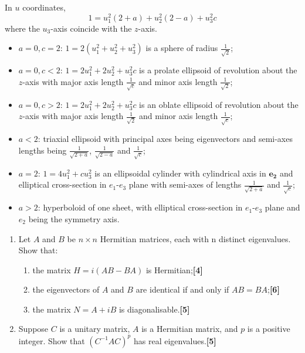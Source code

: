 \documentclass[a4paper]{article}
\begin{document}
\begin{ans}
\begin{enumerate}[label=(\alph*)]
In $u$ coordinates, $$1=u_1^2(2+a)+u_2^2(2-a)+u_3^2c$$
where the $u_3$-axis coincide with the $z$-axis.
\begin{itemize}
    \item $a=0,c=2$: $1=2(u_1^2+u_2^2+u_3^2)$ is a sphere of radius $\frac{1}{\sqrt{2}}$;
    \item $a=0,c<2$: $1=2u_1^2+2u_2^2+u_3^2c$ is a prolate ellipsoid of revolution about the $z$-axis with major axis length $\frac{1}{\sqrt{c}}$ and minor axis length $\frac{1}{\sqrt{2}}$;
    \item $a=0,c>2$: $1=2u_1^2+2u_2^2+u_3^2c$ is an oblate ellipsoid of revolution about the $z$-axis with major axis length $\frac{1}{\sqrt{2}}$ and minor axis length $\frac{1}{\sqrt{c}}$;
    \item $a<2$: triaxial ellipsoid with principal axes being eigenvectors and semi-axes lengths being $\frac{1}{\sqrt{2+a}}$, $\frac{1}{\sqrt{2-a}}$ and $\frac{1}{\sqrt{c}}$;
    \item $a=2$: $1=4u_1^2+cu_3^2$ is an ellipsoidal cylinder with cylindrical axis in $\mathbf{e_2}$ and elliptical cross-section in $e_1$-$e_3$ plane with semi-axes of lengths $\frac{1}{\sqrt{2+a}}$ and $\frac{1}{\sqrt{c}}$;
    \item $a>2$: hyperboloid of one sheet, with elliptical cross-section in $e_1$-$e_3$ plane and $e_2$ being the symmetry axis.
\end{itemize}
\end{enumerate}
\end{ans}
\newpage
\begin{qns}\leavevmode
\begin{enumerate}[label=(\alph*)]
\item Let $A$ and $B$ be $n\times n$ Hermitian matrices, each with n distinct eigenvalues. Show that:
\begin{enumerate}[label=(\roman*)]
\item the matrix $H = i(AB − BA)$ is Hermitian;\hfill\textbf{[4]}
\item the eigenvectors of $A$ and $B$ are identical if and only if $AB = BA$;\hfill\textbf{[6]}
\item the matrix $N = A + iB$ is diagonalisable.\hfill\textbf{[5]}
\end{enumerate}
\item Suppose $C$ is a unitary matrix, $A$ is a Hermitian matrix, and $p$ is a positive integer. Show that $(C^{−1}AC)^p$ has real eigenvalues.\hfill\textbf{[5]}
\end{enumerate}
\end{qns}
\end{document}
